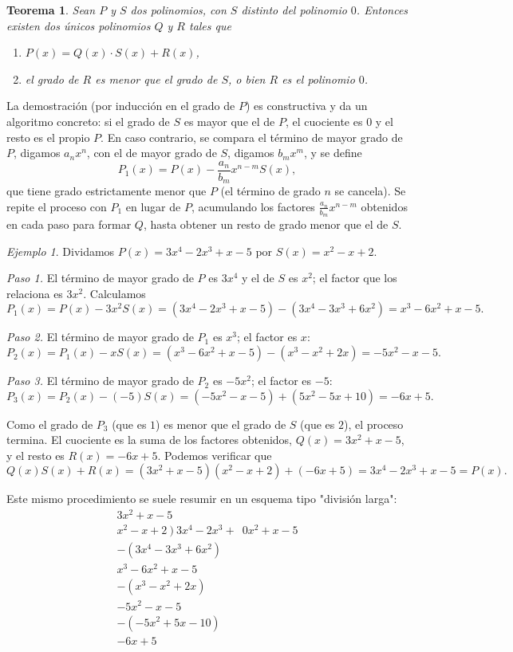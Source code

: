 \documentclass[11pt]{article}
\newtheorem{teorema}{Teorema}[section]
\theoremstyle{remark}
\newtheorem*{ejemplo}{Ejemplo}
\begin{document}
\begin{teorema}\label{teo:division}
Sean $P$ y $S$ dos polinomios, con $S$ distinto del polinomio $0$. Entonces
existen dos únicos polinomios $Q$ y $R$ tales que
\begin{enumerate}[label=(\Roman*)]
\item $P(x) = Q(x)\cdot S(x) + R(x)$,
\item el grado de $R$ es menor que el grado de $S$, o bien $R$ es el
polinomio $0$.
\end{enumerate}
\end{teorema}

La demostración (por inducción en el grado de $P$) es constructiva y da un
algoritmo concreto: si el grado de $S$ es mayor que el de $P$, el cuociente es
$0$ y el resto es el propio $P$. En caso contrario, se compara el término de
mayor grado de $P$, digamos $a_n x^n$, con el de mayor grado de $S$, digamos
$b_m x^m$, y se define
$$P_1(x) = P(x) - \frac{a_n}{b_m}x^{n-m}S(x),$$
que tiene grado estrictamente menor que $P$ (el término de grado $n$ se
cancela). Se repite el proceso con $P_1$ en lugar de $P$, acumulando los
factores $\frac{a_n}{b_m}x^{n-m}$ obtenidos en cada paso para formar $Q$, hasta
obtener un resto de grado menor que el de $S$.

\begin{ejemplo}
Dividamos $P(x) = 3x^4 - 2x^3 + x - 5$ por $S(x) = x^2 - x + 2$.

\textit{Paso 1.} El término de mayor grado de $P$ es $3x^4$ y el de $S$ es
$x^2$; el factor que los relaciona es $3x^2$. Calculamos
$$P_1(x) = P(x) - 3x^2 S(x) = (3x^4-2x^3+x-5) - (3x^4-3x^3+6x^2) = x^3 - 6x^2 + x - 5.$$

\textit{Paso 2.} El término de mayor grado de $P_1$ es $x^3$; el factor es $x$:
$$P_2(x) = P_1(x) - xS(x) = (x^3-6x^2+x-5) - (x^3-x^2+2x) = -5x^2 - x - 5.$$

\textit{Paso 3.} El término de mayor grado de $P_2$ es $-5x^2$; el factor es
$-5$:
$$P_3(x) = P_2(x) - (-5)S(x) = (-5x^2-x-5) + (5x^2-5x+10) = -6x+5.$$

Como el grado de $P_3$ (que es $1$) es menor que el grado de $S$ (que es
$2$), el proceso termina. El cuociente es la suma de los factores obtenidos,
$Q(x) = 3x^2 + x - 5$, y el resto es $R(x) = -6x + 5$. Podemos verificar que
$$Q(x)S(x) + R(x) = (3x^2+x-5)(x^2-x+2) + (-6x+5) = 3x^4-2x^3+x-5 = P(x).$$

Este mismo procedimiento se suele resumir en un esquema tipo "división
larga":
$$
\begin{array}{r}
3x^2+x-5 \\
\hline
x^2-x+2 \ \big) \ 3x^4-2x^3+\phantom{0}0x^2+x-5 \\
-(3x^4-3x^3+6x^2)\phantom{+x-5}\\
\hline
x^3-6x^2+x-5\phantom{0}\\
-(x^3-x^2+2x)\phantom{-5}\\
\hline
-5x^2-x-5\phantom{0}\\
-(-5x^2+5x-10)\phantom{0}\\
\hline
-6x+5
\end{array}
$$
\end{ejemplo}
\end{document}

